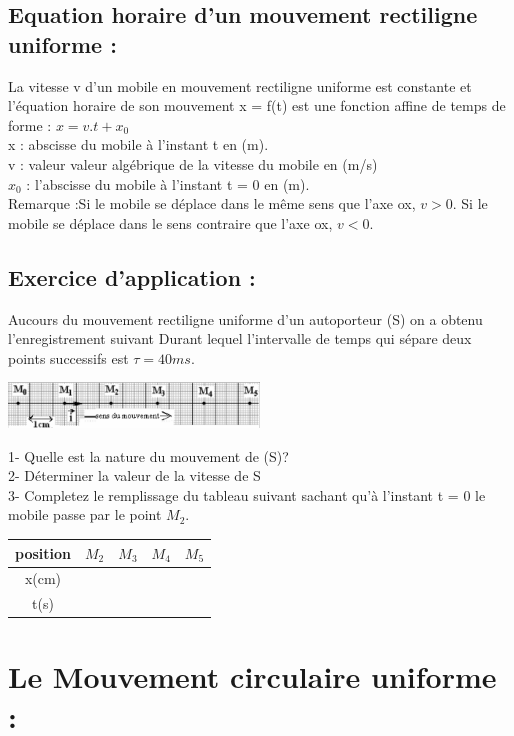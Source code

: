 \documentclass[12pt]{article}
\begin{document}
\subsection{Equation horaire d'un mouvement rectiligne uniforme : }
La vitesse v d'un mobile en mouvement rectiligne uniforme est constante et l'équation horaire de son mouvement x = f(t) est une fonction affine de temps de forme : $x = v.t + x_0$ \\x : abscisse du mobile à l'instant t en (m).\\
v : valeur valeur algébrique de la vitesse du mobile en (m/s)
\\$x_0$ : l'abscisse du mobile à l'instant t = 0 en (m).
\\
Remarque  :Si le mobile se déplace dans le même sens que l'axe ox, $v>0$. Si le mobile se déplace dans le sens contraire que l'axe ox, $v<0$.

\subsection{Exercice d'application : }
Aucours du mouvement rectiligne uniforme d'un autoporteur (S) on a obtenu l'enregistrement suivant Durant lequel l'intervalle de temps qui sépare deux points successifs est $\tau = 40ms$.
\begin{center}
\centering
\includegraphics[width=0.5\textwidth]{./img/img09.png}
\end{center}
1- Quelle est la nature du mouvement de (S)?
\\2- Déterminer la valeur de la vitesse de S
\\3- Completez le remplissage du tableau suivant sachant qu'à l'instant t = 0 le mobile passe par le point $M_2$.
\begin{center}
\begin{tabular}{|c|c|c|c|c|}
    \hline
    position        & $M_2$ & $M_3$ & $M_4$ &$M_5$     \\\hline
    x(cm)           &       &          & &\\\hline
    t(s)            &       &          & &\\\hline

\end{tabular}
\end{center}
\section{Le Mouvement circulaire uniforme : }
\end{document}
